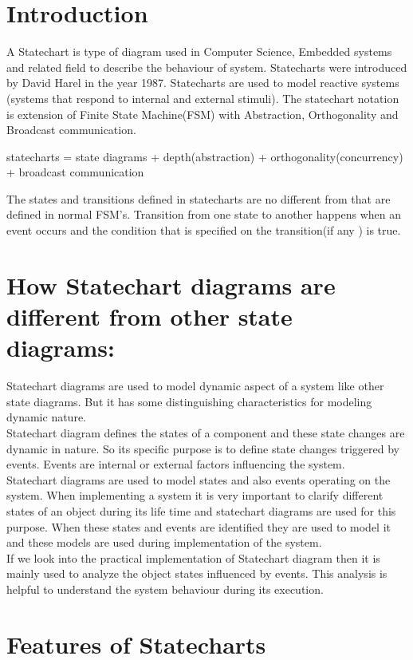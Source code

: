 \documentclass[a4paper,12pt,oneside]{article}
\begin{document}
\section{Introduction}
A Statechart is type of diagram used in Computer Science, Embedded systems and related field to describe the behaviour of system. Statecharts were introduced by David Harel in the year 1987. Statecharts are used to model reactive systems (systems that respond  to internal and external stimuli). The statechart notation is extension of Finite State Machine(FSM) with Abstraction, Orthogonality and Broadcast communication. \begin{center}
statecharts = state diagrams + depth(abstraction) + orthogonality(concurrency) + broadcast communication \end{center}
The states and transitions defined in statecharts are no different from that are defined in normal FSM's.  Transition from one state to another happens when an event occurs and the condition that is specified on the transition(if any ) is true.
\newpage
\section{How Statechart diagrams are different from other state diagrams:}
Statechart diagrams are used to model dynamic aspect of a system like other state diagrams. But it has some distinguishing characteristics for modeling dynamic nature.\\
Statechart diagram defines the states of a component and these state changes are dynamic in nature. So its specific purpose is to define state changes triggered by events. Events are internal or external factors influencing the system.\\
Statechart diagrams are used to model states and also events operating on the system. When implementing a system it is very important to clarify different states of an object during its life time and statechart diagrams are used for this purpose. When these states and events are identified they are used to model it and these models are used during implementation of the system.\\
If we look into the practical implementation of Statechart diagram then it is mainly used to analyze the object states influenced by events. This analysis is helpful to understand the system behaviour during its execution.\\
\newpage

\section{Features of Statecharts}
\end{document}
